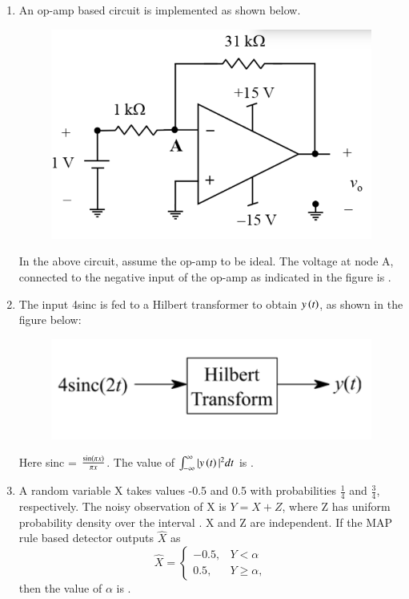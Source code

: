 \documentclass[a4paper, 11pt]{article}
\begin{document}
\begin{enumerate}
    \item An op-amp based circuit is implemented as shown below.
    \begin{figure}[H]
        \centering
        \includegraphics[width=0.6\columnwidth]{figs/q38.png}
        \caption*{}
        \label{fig:q38}
    \end{figure}
    In the above circuit, assume the op-amp to be ideal. The voltage  at node A, connected to the negative input of the op-amp as indicated in the figure is \underline{\hspace{2cm}}.

    \hfill{}

    \item The input 4sinc is fed to a Hilbert transformer to obtain $y\left(t\right)$, as shown in the figure below:
    \begin{figure}[H]
        \centering
        \includegraphics[width=0.5\columnwidth]{figs/q39.png}
        \caption*{}
        \label{fig:q39}
    \end{figure}
    Here sinc = $\frac{\sin\left(\pi x\right)}{\pi x}$.
    The value  of $\int_{-\infty}^{\infty} |y\left(t\right)|^2 dt$ is \underline{\hspace{2cm}}.

    \hfill{}

    \item A random variable X takes values -0.5 and 0.5 with probabilities $\frac{1}{4}$ and $\frac{3}{4}$, respectively. The noisy observation of X is $Y = X + Z$, where Z has uniform probability density over the interval . X and Z are independent. If the MAP rule based detector outputs $\hat{X}$ as
    \[ \hat{X} = \begin{cases} -0.5, & Y < \alpha \\ 0.5, & Y \ge \alpha, \end{cases} \]
    then the value of $\alpha$  is \underline{\hspace{2cm}}.


\end{enumerate}
\end{document}
